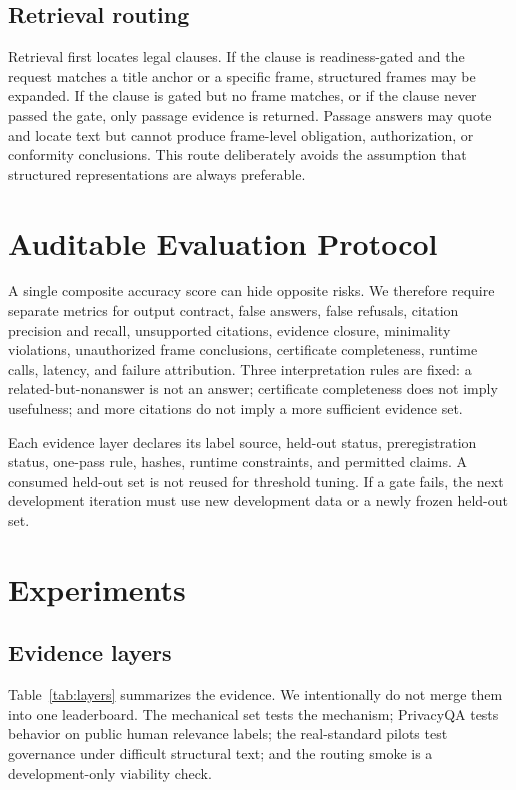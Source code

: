 \documentclass[11pt]{article}
\begin{document}
\subsection{Retrieval routing}

Retrieval first locates legal clauses. If the clause is readiness-gated and the request matches a title anchor or a specific frame, structured frames may be expanded. If the clause is gated but no frame matches, or if the clause never passed the gate, only passage evidence is returned. Passage answers may quote and locate text but cannot produce frame-level obligation, authorization, or conformity conclusions. This route deliberately avoids the assumption that structured representations are always preferable.

\section{Auditable Evaluation Protocol}
\label{sec:protocol}

A single composite accuracy score can hide opposite risks. We therefore require separate metrics for output contract, false answers, false refusals, citation precision and recall, unsupported citations, evidence closure, minimality violations, unauthorized frame conclusions, certificate completeness, runtime calls, latency, and failure attribution. Three interpretation rules are fixed: a related-but-nonanswer is not an answer; certificate completeness does not imply usefulness; and more citations do not imply a more sufficient evidence set.

Each evidence layer declares its label source, held-out status, preregistration status, one-pass rule, hashes, runtime constraints, and permitted claims. A consumed held-out set is not reused for threshold tuning. If a gate fails, the next development iteration must use new development data or a newly frozen held-out set.

\section{Experiments}
\label{sec:experiments}

\subsection{Evidence layers}

Table~\ref{tab:layers} summarizes the evidence. We intentionally do not merge them into one leaderboard. The mechanical set tests the mechanism; PrivacyQA tests behavior on public human relevance labels; the real-standard pilots test governance under difficult structural text; and the routing smoke is a development-only viability check.
\end{document}
